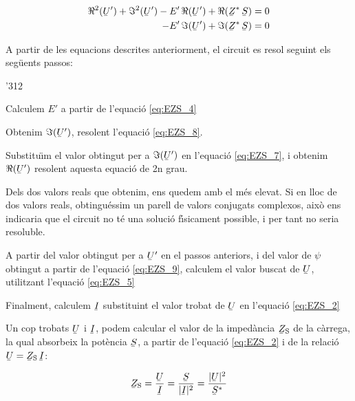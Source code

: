 \begin{align}
   \Re^2(\cmplx{U}') + \Im^2(\cmplx{U}') - E' \, \Re(\cmplx{U}') + \Re(\cmplx{Z}^* \, \cmplx{S}) &= 0 \label{eq:EZS_7} \\
   - E' \, \Im(\cmplx{U}') + \Im(\cmplx{Z}^* \, \cmplx{S}) &= 0 \label{eq:EZS_8}
\end{align}

A partir de les equacions descrites anteriorment, el circuit es resol seguint els seg\"{u}ents passos:
\begin{dingautolist}{'312}
   \item Calculem $E'$ a partir de l'equaci\'{o} \eqref{eq:EZS_4}
   \item Obtenim $\Im(\cmplx{U}')$, resolent l'equaci\'{o} \eqref{eq:EZS_8}.
   \item Substitu\"{\i}m el valor obtingut per a $\Im(\cmplx{U}')$ en l'equaci\'{o} \eqref{eq:EZS_7}, i obtenim $\Re(\cmplx{U}')$ resolent aquesta equaci\'{o} de 2n grau.
   \item Dels dos valors reals que obtenim, ens quedem amb el m\'{e}s elevat. Si en lloc de dos valors reals, obtingu\'{e}ssim un parell de valors conjugats complexos, aix\`{o} ens indicaria que el circuit no t\'{e} una soluci\'{o} f\'{\i}sicament possible, i per tant no seria resoluble.
   \item A partir del valor  obtingut per a $\cmplx{U}'$ en el passos anteriors, i del valor de $\psi$ obtingut a partir de l'equaci\'{o} \eqref{eq:EZS_9}, calculem el valor buscat de $\cmplx{U}$, utilitzant l'equaci\'{o} \eqref{eq:EZS_5}
   \item Finalment, calculem $\cmplx{I}$ substituint el valor trobat de $\cmplx{U}$ en l'equaci\'{o} \eqref{eq:EZS_2}
\end{dingautolist}

Un cop trobats $\cmplx{U}$ i $\cmplx{I}$, podem calcular el valor de
la imped\`{a}ncia  $\cmplx{Z}\ped{S}$ de la c\`{a}rrega, la qual absorbeix
la pot\`{e}ncia $\cmplx{S}$, a partir de l'equaci\'{o} \eqref{eq:EZS_2} i de
la relaci\'{o} $\cmplx{U} = \cmplx{Z}\ped{S} \,\cmplx{I}$:

\begin{equation}
   \cmplx{Z}\ped{S} = \frac{\cmplx{U}}{\cmplx{I}} =
   \frac{\cmplx{S}}{|\cmplx{I}|^2} =
   \frac{|\cmplx{U}|^2}{\cmplx{S}^*} \label{eq:EZS 10}
\end{equation}

